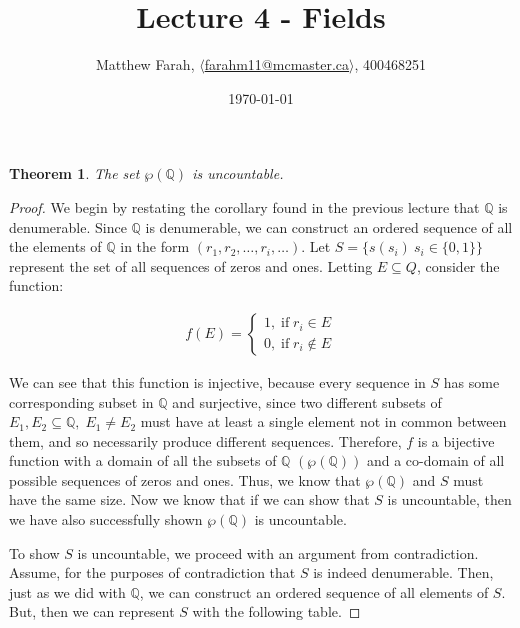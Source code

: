 \documentclass{article}
\title{Lecture 4 - Fields}
\author{Matthew Farah, \href{mailto:farahm11@mcmaster.ca}{$\langle$farahm11@mcmaster.ca$\rangle$}, 400468251}
\date{\today}
\newtheorem{theorem}{Theorem}
\begin{document}
\maketitle
\pagestyle{fancy}

\begin{theorem}
The set $\wp(\mathbb{Q})$ is uncountable.
\end{theorem}

\begin{proof}
	We begin by restating the corollary found in the previous lecture that $\mathbb{Q}$ is denumerable. Since $\mathbb{Q}$ is denumerable, we can construct an ordered sequence of all the elements of $\mathbb{Q}$ in the form $(r_1, r_2, \ldots, r_i, \ldots )$. Let $S = \{s (s_i)\: s_i \in \{0, 1\}\}$ represent the set of all sequences of zeros and ones. Letting $E \subseteq Q$, consider the function:
	
	\begin{align*}
		f(E) = \begin{cases} 1, \; \text{if} \; r_i \in E \\ 0, \; \text{if} \; r_i \notin E \end{cases}
	\end{align*}

	We can see that this function is injective, because every sequence in $S$ has some corresponding subset in $\mathbb{Q}$ and surjective, since two different subsets of $E_1, E_2 \subseteq \mathbb{Q}, \; E_1 \neq E_2$ must have at least a single element not in common between them, and so necessarily produce different sequences. Therefore, $f$ is a bijective function with a domain of all the subsets of $\mathbb{Q}$ $(\wp(\mathbb{Q}))$ and a co-domain of all possible sequences of zeros and ones. Thus, we know that $\wp(\mathbb{Q})$ and $S$ must have the same size. Now we know that if we can show that $S$ is uncountable, then we have also successfully shown $\wp(\mathbb{Q})$ is uncountable.

	To show $S$ is uncountable, we proceed with an argument from contradiction. Assume, for the purposes of contradiction that $S$ is indeed denumerable. Then, just as we did with $\mathbb{Q}$, we can construct an ordered sequence of all elements of $S$. But, then we can represent $S$ with the following table.
	
	\vspace{1cm}


\end{proof}
\end{document}

